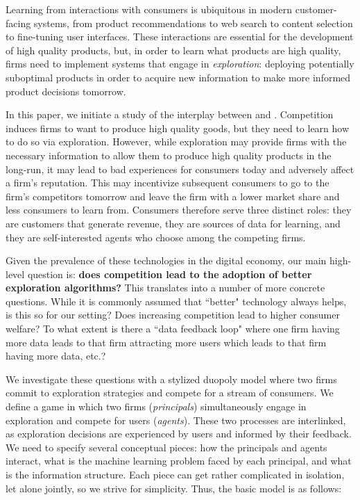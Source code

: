 Learning from interactions with consumers is ubiquitous in modern customer-facing systems, from product recommendations to web search to content selection to fine-tuning user interfaces. These interactions are essential for the development of high quality products, but, in order to learn what products are high quality, firms need to implement systems that engage in \emph{exploration}: deploying potentially suboptimal products in order to acquire new information to make more informed product decisions tomorrow.

In this paper, we initiate a study of the interplay between \exploration and \competition. Competition induces firms to want to produce high quality goods, but they need to learn how to do so via exploration. However, while exploration may provide firms with the necessary information to allow them to produce high quality products in the long-run, it may lead to bad experiences for consumers today and adversely affect a firm's reputation. This may incentivize subsequent consumers to go to the firm's competitors tomorrow and leave the firm with a lower market share and less consumers to learn from. Consumers therefore serve three distinct roles: they are customers that generate revenue, they are sources of data for learning, and they are self-interested agents who choose among the competing firms.

Given the prevalence of these technologies in the digital economy, our main high-level question is: {\bf does competition lead to the adoption of better exploration algorithms?} This translates into a number of more concrete questions. While it is commonly assumed that ``better" technology always helps, is this so for our setting? Does increasing competition lead to higher consumer welfare? To what extent is there a ``data feedback loop" where one firm having more data leads to that firm attracting more users which leads to that firm having more data, etc.?




 We investigate these questions with a stylized duopoly model where two firms commit to exploration strategies and compete for a stream of consumers. We define a game in which two firms (\emph{principals}) simultaneously engage in exploration and compete for users (\emph{agents}). These two processes are interlinked, as exploration decisions are experienced by users and informed by their feedback. We need to specify several conceptual pieces: how the principals and agents interact, what is the machine learning problem faced by each principal, and what is the information structure. Each piece can get rather complicated in isolation, let alone jointly, so we strive for simplicity. Thus, the basic model is as follows:

